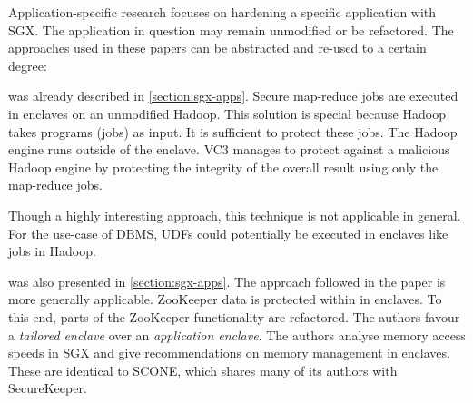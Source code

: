 Application-specific research focuses on hardening a specific application with SGX.\label{ID_850970450}
The application in question may remain unmodified or be refactored.\label{ID_1741592427}
The approaches used in these papers can be abstracted and re-used to a certain degree:\label{ID_847972034}
\begin{description}\label{ID_1664874304}
\item[Verifiable Confidential Cloud Computing (VC3)\cite{Schuster2015}]\label{ID_1304842913}
was already described in \autoref{section:sgx-apps}.\label{ID_1185628438}
Secure map-reduce jobs are executed in enclaves on an unmodified Hadoop.\label{ID_1823018069}
This solution is special because Hadoop takes programs (jobs) as input. It is sufficient to protect these jobs.\label{ID_854444196}
The Hadoop engine runs outside of the enclave.\label{ID_252101904}
VC3 manages to protect against a malicious Hadoop engine by protecting the integrity of the overall result using only the map-reduce jobs.\label{ID_206695222}

Though a highly interesting approach, this technique is not applicable in general.\label{ID_90782568}
For the use-case of DBMS, UDFs could potentially be executed in enclaves like jobs in Hadoop.\label{ID_441442629}
\item[SecureKeeper\cite{Brenner2016}]\label{ID_848289283}
was also presented in \autoref{section:sgx-apps}.\label{ID_536070}
The approach followed in the paper is more generally applicable.\label{ID_1832244015}
ZooKeeper data is protected within in enclaves. To this end, parts of the ZooKeeper functionality are refactored.\label{ID_1230630126}
The authors favour a \textit{tailored enclave} over an \textit{application enclave}.\label{ID_286232957}
The authors analyse memory access speeds in SGX and give recommendations on memory management in enclaves.\label{ID_623865893}
These are identical to SCONE, which shares many of its authors with SecureKeeper.\label{ID_401918155}
\end{description}\label{ID_867871996}

